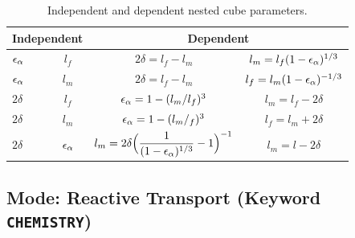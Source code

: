 \begin{table}\centering
\caption{Independent and dependent nested cube parameters.}
\label{tnestedcube}
\vspace{3mm}
\begin{tabular}{lccc}
\toprule
\multicolumn{2}{c}{Independent} & \multicolumn{2}{c}{Dependent}\\
\midrule
$\epsilon_{\alpha}$ & $l_f$ & $2\delta = l_f - l_m$ & $l_m = l_f(1-\epsilon_{\alpha})^{1/3}$\\
$\epsilon_{\alpha}$ & $l_m$ & $2\delta = l_f - l_m$ & $l_f = l_m(1-\epsilon_{\alpha})^{-1/3}$\\
$2\delta$ & $l_f$ & $\epsilon_{\alpha} = 1-(l_m/l_f)^3$ & $l_m = l_f - 2\delta$\\
$2\delta$ & $l_m$ & $\epsilon_{\alpha} = 1-(l_m/_f)^3$ & $l_f = l_m + 2\delta$\\
$2\delta$ & $\epsilon_{\alpha}$ & $l_m = 2\delta \Big(\dfrac{1}{(1-\epsilon_{\alpha})^{1/3}}-1\Big)^{-1}$ & $l_m = l-2\delta$\\
\bottomrule
\end{tabular}
\end{table}


\subsection{Mode: Reactive Transport (Keyword {\tt CHEMISTRY})}\label{sec:chem}

